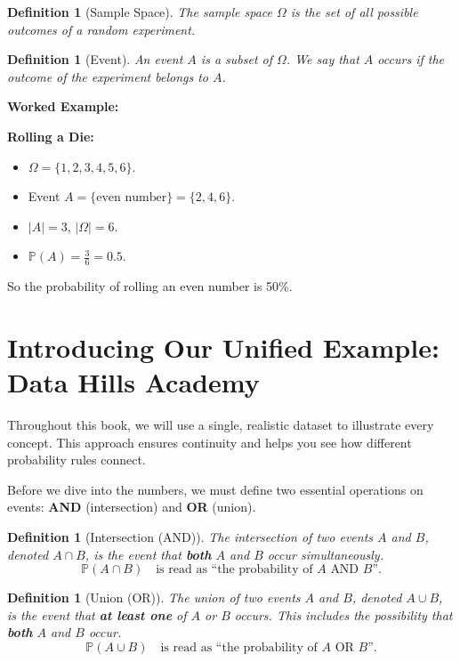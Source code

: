 \documentclass[12pt,a4paper,oneside]{report}
\theoremstyle{mytheorem}
\theoremstyle{mydefinition}
\newtheorem{definition}[theorem]{Definition}
\theoremstyle{myremark}
\newenvironment{worked}{%
  \par\medskip\noindent\textbf{\color{myorange}Worked Example:}\par\smallskip
}{%
  \par\medskip
}
\newcommand{\Prob}{\mathbb{P}}
\begin{document}
\begin{definition}[Sample Space]
The sample space $\Omega$ is the set of all possible outcomes of a random experiment.
\end{definition}

\begin{definition}[Event]
An event $A$ is a subset of $\Omega$. We say that $A$ occurs if the outcome of the experiment belongs to $A$.
\end{definition}

\begin{worked}
\textbf{Rolling a Die:}
\begin{itemize}
    \item $\Omega = \{1,2,3,4,5,6\}$.
    \item Event $A = \{\text{even number}\} = \{2,4,6\}$.
    \item $|A| = 3$, $|\Omega| = 6$.
    \item $\Prob(A) = \frac{3}{6} = 0.5$.
\end{itemize}
So the probability of rolling an even number is 50\%.
\end{worked}

\section{Introducing Our Unified Example: Data Hills Academy}
Throughout this book, we will use a single, realistic dataset to illustrate every concept. This approach ensures continuity and helps you see how different probability rules connect.

Before we dive into the numbers, we must define two essential operations on events: \textbf{AND} (intersection) and \textbf{OR} (union).

\begin{definition}[Intersection (AND)]
The intersection of two events $A$ and $B$, denoted $A \cap B$, is the event that \textbf{both} $A$ and $B$ occur simultaneously.
\[
\Prob(A \cap B) \quad\text{is read as ``the probability of $A$ AND $B$''}.
\]
\end{definition}

\begin{definition}[Union (OR)]
The union of two events $A$ and $B$, denoted $A \cup B$, is the event that \textbf{at least one} of $A$ or $B$ occurs. This includes the possibility that \textbf{both} $A$ and $B$ occur.
\[
\Prob(A \cup B) \quad\text{is read as ``the probability of $A$ OR $B$''}.
\]
\end{definition}
\end{document}
